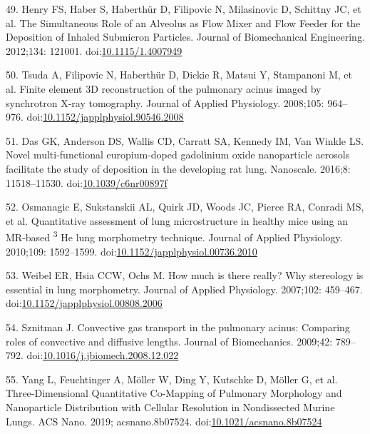\documentclass[
  american,
]{article}
\newenvironment{cslreferences}%
  {}%
  {\par}
\begin{document}
\begin{cslreferences}
\leavevmode\hypertarget{ref-1HOyVjqpM}{}%
49. Henry FS, Haber S, Haberthür D, Filipovic N, Milasinovic D, Schittny JC, et al. The Simultaneous Role of an Alveolus as Flow Mixer and Flow Feeder for the Deposition of Inhaled Submicron Particles. Journal of Biomechanical Engineering. 2012;134: 121001. doi:\href{https://doi.org/10.1115/1.4007949}{10.1115/1.4007949}

\leavevmode\hypertarget{ref-OT4s1CSX}{}%
50. Tsuda A, Filipovic N, Haberthür D, Dickie R, Matsui Y, Stampanoni M, et al. Finite element 3D reconstruction of the pulmonary acinus imaged by synchrotron X-ray tomography. Journal of Applied Physiology. 2008;105: 964--976. doi:\href{https://doi.org/10.1152/japplphysiol.90546.2008}{10.1152/japplphysiol.90546.2008}

\leavevmode\hypertarget{ref-VJYqPtdT}{}%
51. Das GK, Anderson DS, Wallis CD, Carratt SA, Kennedy IM, Van Winkle LS. Novel multi-functional europium-doped gadolinium oxide nanoparticle aerosols facilitate the study of deposition in the developing rat lung. Nanoscale. 2016;8: 11518--11530. doi:\href{https://doi.org/10.1039/c6nr00897f}{10.1039/c6nr00897f}

\leavevmode\hypertarget{ref-LzalnLBH}{}%
52. Osmanagic E, Sukstanskii AL, Quirk JD, Woods JC, Pierce RA, Conradi MS, et al. Quantitative assessment of lung microstructure in healthy mice using an MR-based \textsuperscript{3} He lung morphometry technique. Journal of Applied Physiology. 2010;109: 1592--1599. doi:\href{https://doi.org/10.1152/japplphysiol.00736.2010}{10.1152/japplphysiol.00736.2010}

\leavevmode\hypertarget{ref-1CLJ32t5m}{}%
53. Weibel ER, Hsia CCW, Ochs M. How much is there really? Why stereology is essential in lung morphometry. Journal of Applied Physiology. 2007;102: 459--467. doi:\href{https://doi.org/10.1152/japplphysiol.00808.2006}{10.1152/japplphysiol.00808.2006}

\leavevmode\hypertarget{ref-RJ9GQcwl}{}%
54. Sznitman J. Convective gas transport in the pulmonary acinus: Comparing roles of convective and diffusive lengths. Journal of Biomechanics. 2009;42: 789--792. doi:\href{https://doi.org/10.1016/j.jbiomech.2008.12.022}{10.1016/j.jbiomech.2008.12.022}

\leavevmode\hypertarget{ref-19jBv0ima}{}%
55. Yang L, Feuchtinger A, Möller W, Ding Y, Kutschke D, Möller G, et al. Three-Dimensional Quantitative Co-Mapping of Pulmonary Morphology and Nanoparticle Distribution with Cellular Resolution in Nondissected Murine Lungs. ACS Nano. 2019; acsnano.8b07524. doi:\href{https://doi.org/10.1021/acsnano.8b07524}{10.1021/acsnano.8b07524}


\end{cslreferences}
\end{document}
